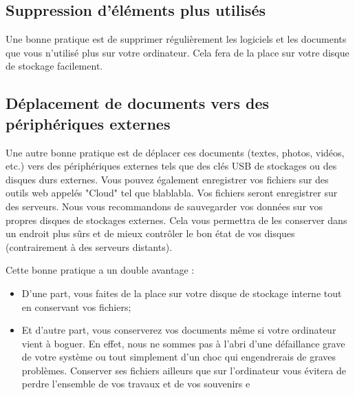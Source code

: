 \documentclass[12pt]{book}
\begin{document}
		\subsection{Suppression d'éléments plus utilisés}
			Une bonne pratique est de supprimer régulièrement les logiciels et les documents que vous n'utilisé plus sur votre ordinateur.
			Cela fera de la place sur votre disque de stockage facilement.
		\subsection{Déplacement de documents vers des périphériques externes}
			Une autre bonne pratique est de déplacer ces documents (textes, photos, vidéos, etc.) vers des périphériques externes tels que des clés USB de stockages ou des disques durs externes.
			Vous pouvez également enregistrer vos fichiers sur des outils web appelés "Cloud" tel que blablabla.
			Vos fichiers seront enregistrer sur des serveurs.
			Nous vous recommandons de sauvegarder vos données sur vos propres disques de stockages externes.
			Cela vous permettra de les conserver dans un endroit plus sûrs et de mieux contrôler le bon état de vos disques (contrairement à des serveurs distants).\par
			Cette bonne pratique a un double avantage :
			\begin{itemize}
				\item D'une part, vous faites de la place sur votre disque de stockage interne tout en conservant vos fichiers;
				\item Et d'autre part, vous conserverez vos documents même si votre ordinateur vient à boguer.
				En effet, nous ne sommes pas à l'abri d'une défaillance grave de votre système ou tout simplement d'un choc qui engendrerais de graves problèmes.
				Conserver ses fichiers ailleurs que sur l'ordinateur vous évitera de perdre l'ensemble de vos travaux et de vos souvenirs e
			\end{itemize}
\end{document}
